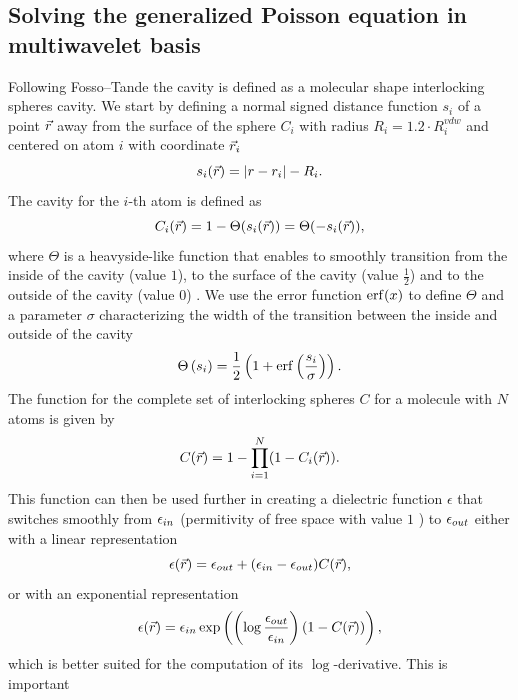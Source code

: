\documentclass[../Thesis.tex]{subfiles}
\begin{document}
\subsection{Solving the generalized Poisson equation in multiwavelet basis}\label{solmw}
Following Fosso--Tande \cite{FossoTande:2013ka} the cavity is defined as a molecular shape
interlocking spheres cavity. We start by defining a normal
signed distance function $s_i$ of a point $\vec{r}$ away from the surface of the
sphere $C_i$ with radius $R_i = 1.2\cdot R^{vdw}_i$ and centered on atom $i$ with
coordinate $\vec{r}_i$ \cite{FossoTande:2013ka}
\begin{equation}
  s_i(\vec{r}) = \abs{r -r_i} - R_i.
\end{equation}
The cavity for the $i$-th atom is defined as
\begin{equation}
  C_i(\vec{r}) = 1 - \Theta(s_i(\vec{r})) =\Theta(-s_i(\vec{r})),
\end{equation}
where $\Theta$ is a heavyside-like function that enables to smoothly transition
from the inside of the cavity (value $1$), to the surface of the cavity (value
$\frac{1}{2}$) and to the outside of the cavity (value $0$)
\cite{Sorland, FossoTande:2013ka}. We use the error function $\erf(x)$ to define
$\Theta$ and a parameter $\sigma$ characterizing the width of the transition
between the inside and outside of the cavity
\begin{equation}
  \Theta\left(s_i\right) = \frac{1}{2}\left(1 + \erf\left(\frac{s_i}
  {\sigma}\right)\right).
\end{equation}
The function for the complete set of interlocking spheres $C$ for a molecule
with $N$ atoms is given by
\begin{equation}
  C(\vec{r}) = 1 - \prod_{i=1}^N(1 - C_i(\vec{r})).
\end{equation}
This function can then be used further in creating a dielectric function
$\epsilon$ that switches smoothly from $\epsilon_{in}$ (permitivity of free space
with value $1$ \cite{FossoTande:2013ka}) to $\epsilon_{out}$ either with a linear
representation
\begin{equation}\label{eq:dielfuncexp}
  \epsilon(\vec{r}) = \epsilon_{out}  + (\epsilon_{in} - \epsilon_{out})C(\vec{r}),
\end{equation}
or with an exponential representation
\begin{equation}\label{eq:dielfunclin}
  \epsilon(\vec{r}) =\epsilon_{in}\exp\left( \left(\log\frac{\epsilon_{out}}{\epsilon_{in}} \right)
  (1 - C(\vec{r})) \right),
\end{equation}
which is better suited for the computation of its $\log$-derivative. This is important
\end{document}
